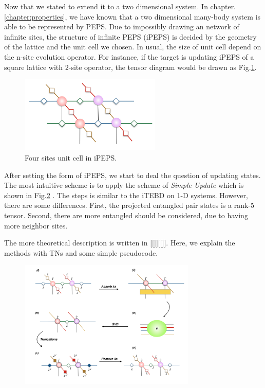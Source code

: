 Now that we stated to extend it to a two dimensional system. In chapter.\ref{chapter:properties}, we have known that a two dimensional many-body system is able to be represented by PEPS. Due to impossibly drawing an network of infinite sites, the structure of infinite PEPS (iPEPS) is decided by the geometry of the lattice and the unit cell we chosen. In usual, the size of unit cell depend on the n-site evolution operator. For instance, if the target is updating iPEPS of a square lattice with 2-site operator, the tensor diagram would be drawn as Fig.\ref{fig314}.

\begin{figure}[ht]
	\centering
	\includegraphics[width=0.6\textwidth]{figures/fig314.png}
	\caption[The tensor diagrams of 2-D lattice]{Four sites unit cell in iPEPS.}
	\label{fig314}
\end{figure}

After setting the form of iPEPS, we start to deal the question of updating states. The most intuitive scheme is to apply the scheme of \textit{Simple Update} which is shown in Fig.\ref{fig315} . The steps is similar to the iTEBD on 1-D systems. However, there are some differences. First, the projected entangled pair states is a rank-5 tensor. Second, there are more entangled should be considered, due to having more neighbor sites.

The more theoretical description is written in [\ref{}][\ref{}]. Here, we explain the methods with TNs and some simple pseudocode.

	\begin{figure}[ht]
	\centering
	\includegraphics[width=0.75\textwidth]{figures/fig315.png}
	\caption[The tensor network diagrams for the 2-D iTEBD]{}
	\label{fig315}
\end{figure}

